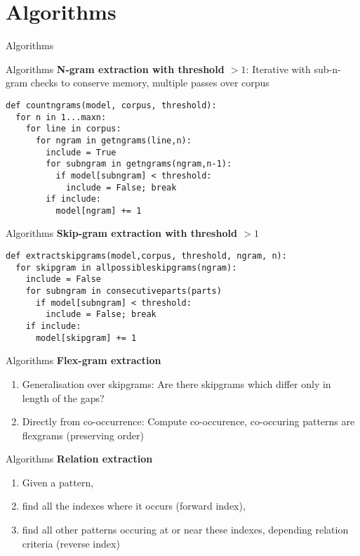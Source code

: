 \documentclass[compress]{beamer}
\begin{document}
\section{Algorithms}

\begin{frame}[fragile]{Algorithms}
  \begin{block}{Algorithms}
      \textbf{N-gram extraction with threshold $>1$}: Iterative with sub-n-gram checks to conserve memory, multiple passes over corpus
\begin{lstlisting}
def countngrams(model, corpus, threshold):
  for n in 1...maxn:
    for line in corpus:
      for ngram in getngrams(line,n):
        include = True
        for subngram in getngrams(ngram,n-1):
          if model[subngram] < threshold:
            include = False; break
        if include:
          model[ngram] += 1 
\end{lstlisting}
  \end{block}
\end{frame}


\begin{frame}[fragile]
  \begin{block}{Algorithms}
      \textbf{Skip-gram extraction with threshold $>1$}
\begin{lstlisting}
def extractskipgrams(model,corpus, threshold, ngram, n):
  for skipgram in allpossibleskipgrams(ngram):
    include = False
    for subngram in consecutiveparts(parts)
      if model[subngram] < threshold:
        include = False; break
    if include:
      model[skipgram] += 1 
\end{lstlisting}
  \end{block}
\end{frame}

\begin{frame}[fragile]
  \begin{block}{Algorithms}
    \textbf{Flex-gram extraction}
    \begin{enumerate}
      \item Generalisation over skipgrams: Are there skipgrams which differ only in length of the gaps?
      \item Directly from co-occurrence: Compute co-occurence, co-occuring patterns are flexgrams (preserving order)
    \end{enumerate}
  \end{block}
\end{frame}


\begin{frame}[fragile]
  \begin{block}{Algorithms}
    \textbf{Relation extraction}
    \begin{enumerate}
      \item Given a pattern,
      \item find all the indexes where it occurs (forward index),
      \item find all other patterns occuring at or near these indexes, depending relation criteria (reverse index)
    \end{enumerate}
  \end{block}
\end{frame}
\end{document}
